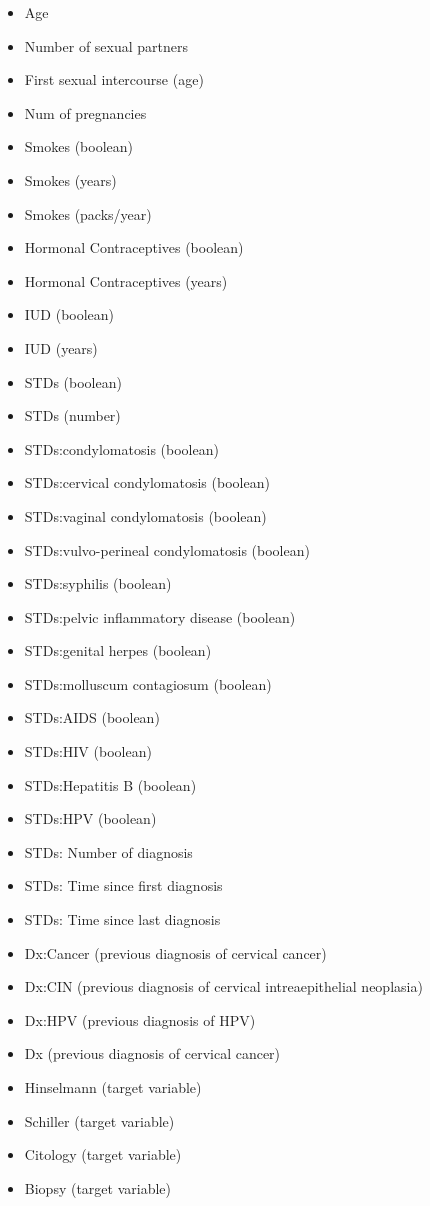 \begin{itemize}
    \item Age
    \item Number of sexual partners
    \item First sexual intercourse (age)
    \item Num of pregnancies
    \item Smokes (boolean)
    \item Smokes (years)
    \item Smokes (packs/year)
    \item Hormonal Contraceptives (boolean)
    \item Hormonal Contraceptives (years)
    \item IUD (boolean)
    \item IUD (years)
    \item STDs (boolean)
    \item STDs (number)
    \item STDs:condylomatosis (boolean)
    \item STDs:cervical condylomatosis (boolean)
    \item STDs:vaginal condylomatosis (boolean)
    \item STDs:vulvo-perineal condylomatosis (boolean)
    \item STDs:syphilis (boolean)
    \item STDs:pelvic inflammatory disease (boolean)
    \item STDs:genital herpes (boolean)
    \item STDs:molluscum contagiosum (boolean)
    \item STDs:AIDS (boolean)
    \item STDs:HIV (boolean)
    \item STDs:Hepatitis B (boolean)
    \item STDs:HPV (boolean)
    \item STDs: Number of diagnosis
    \item STDs: Time since first diagnosis
    \item STDs: Time since last diagnosis
    \item Dx:Cancer (previous diagnosis of cervical cancer)
    \item Dx:CIN (previous diagnosis of cervical intreaepithelial neoplasia)
    \item Dx:HPV (previous diagnosis of HPV)
    \item Dx (previous diagnosis of cervical cancer)
    \item Hinselmann (target variable)
    \item Schiller (target variable)
    \item Citology (target variable)
    \item Biopsy (target variable)
\end{itemize}

